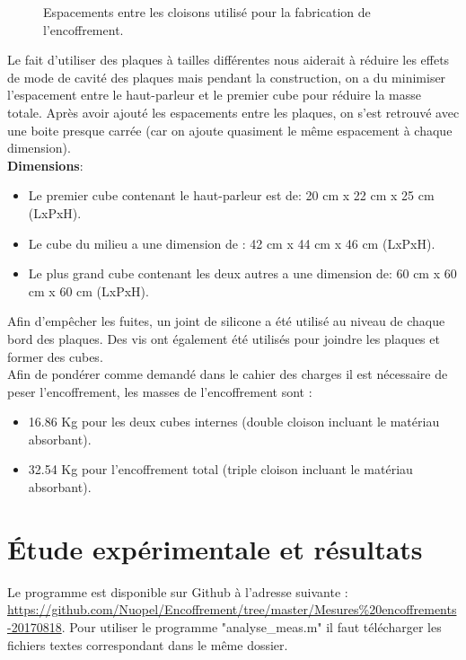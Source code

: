 \documentclass[12pt,foolscap]{report}
\begin{document}
	\begin{figure}[h!]
		\centering
		\caption{Espacements entre les cloisons utilisé pour la fabrication de l'encoffrement.}
		\label{espacement_cloison}
	\end{figure}
	
	Le fait d'utiliser des plaques à tailles différentes nous aiderait à réduire les effets de mode de cavité des plaques mais pendant la construction, on a du minimiser l'espacement entre le haut-parleur et le premier cube pour réduire la masse totale. Après avoir ajouté les espacements entre les plaques, on s'est retrouvé avec une boite presque carrée (car on ajoute quasiment le même espacement à chaque dimension).\\
	
	\textbf{Dimensions}:
	\begin{itemize}
		\item  Le premier cube contenant le haut-parleur est de: 20 cm x 22 cm x 25 cm (LxPxH).
		\item Le cube du milieu a une dimension de : 42 cm x 44 cm x 46 cm (LxPxH). 
		\item Le plus grand cube contenant les deux autres a une dimension de: 60 cm x 60 cm x 60 cm (LxPxH). 
	\end{itemize}

	
	Afin d'empêcher les fuites, un joint de silicone a été utilisé au niveau de chaque bord des plaques. Des vis ont également été utilisés pour joindre les plaques et former des cubes.\\ 
	Afin de pondérer comme demandé dans le cahier des charges il est nécessaire de peser l'encoffrement, les masses de l'encoffrement sont :
	\begin{itemize}
		\item 16.86 Kg pour les deux cubes internes (double cloison incluant le matériau absorbant).
		\item 32.54 Kg pour l'encoffrement total (triple cloison incluant le matériau absorbant).
	\end{itemize}
	
	
	
	
	\chapter{Étude expérimentale et résultats}
	Le programme est disponible sur Github à l'adresse suivante :\\
	\href{https://github.com/Nuopel/Encoffrement/tree/master/Mesures\%20encoffrements-20170818}{https://github.com/Nuopel/Encoffrement/tree/master/Mesures\%20encoffrements-20170818}. Pour utiliser le programme "analyse\_meas.m" il faut télécharger les fichiers textes correspondant dans le même dossier.
\end{document}
